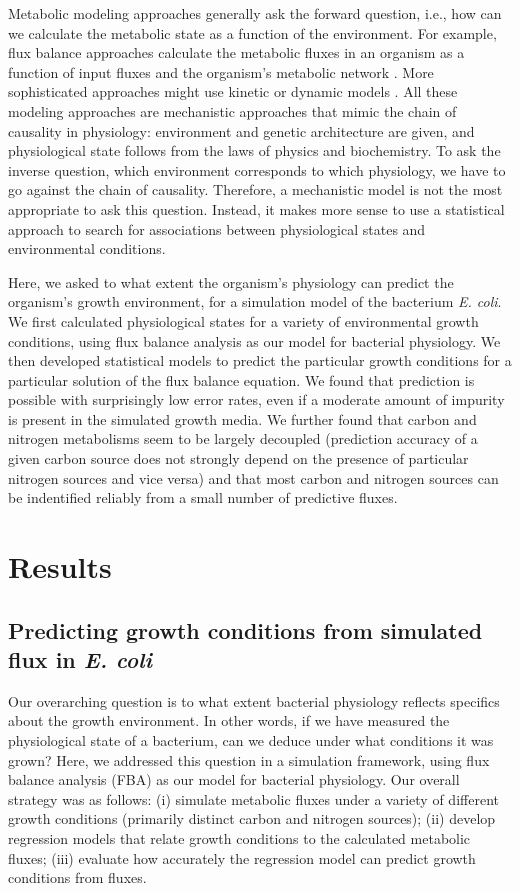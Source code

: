 \documentclass[12pt]{article}
\begin{document}
Metabolic modeling approaches generally ask the forward question, i.e., how can we calculate the metabolic state as a function of the environment. For example, flux balance approaches calculate the metabolic fluxes in an organism as a function of input fluxes and the organism's metabolic network \cite{Segreetal2002,Feistetal2007,SnitkinSegre2008,Orthetal2010}. More sophisticated approaches might use kinetic or dynamic models \cite{Covertetal2008,Adadietal2012}. All these modeling approaches are mechanistic approaches that mimic the chain of causality in physiology: environment and genetic architecture are given, and physiological state follows from the laws of physics and biochemistry. To ask the inverse question, which environment corresponds to which physiology, we have to go against the chain of causality. Therefore, a mechanistic model is not the most appropriate to ask this question. Instead, it makes more sense to use a statistical approach to search for associations between physiological states and environmental conditions.

Here, we asked to what extent the organism's physiology can predict the organism's growth environment, for a simulation model of the bacterium \emph{E. coli}. We first calculated physiological states for a variety of environmental growth conditions, using flux balance analysis as our model for bacterial physiology. We then developed statistical models to predict the particular growth conditions for a particular solution of the flux balance equation. We found that prediction is possible with surprisingly low error rates, even if a moderate amount of impurity is present in the simulated growth media. We further found that carbon and nitrogen metabolisms seem to be largely decoupled (prediction accuracy of a given carbon source does not strongly depend on the presence of particular nitrogen sources and vice versa) and that most carbon and nitrogen sources can be indentified reliably from a small number of predictive fluxes.

\section{Results}

\subsection{Predicting growth conditions from simulated flux in \emph{E. coli}}

Our overarching question is to what extent bacterial physiology reflects specifics about the growth environment. In other words, if we have measured the physiological state of a bacterium, can we deduce under what conditions it was grown? Here, we addressed this question in a simulation framework, using flux balance analysis (FBA) as our model for bacterial physiology. Our overall strategy was as follows: (i) simulate metabolic fluxes under a variety of different growth conditions (primarily distinct carbon and nitrogen sources); (ii) develop regression models that relate growth conditions to the calculated metabolic fluxes; (iii) evaluate how accurately the regression model can predict growth conditions from fluxes.
\end{document}
